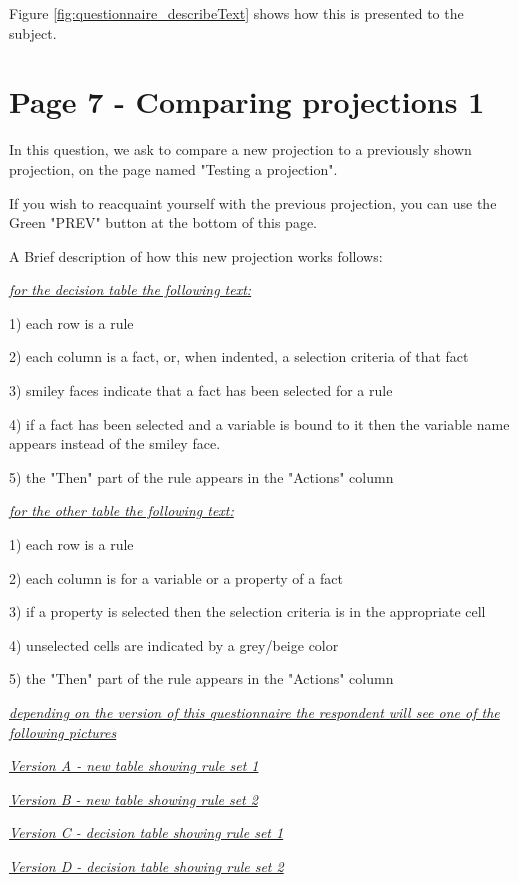 Figure \ref{fig:questionnaire_describeText} shows how this is presented to the subject.

\section{Page 7 - Comparing projections 1}

In this question, we ask to compare a new projection to a previously shown projection, on the page named "Testing a projection".

If you wish to reacquaint yourself with the previous projection, you can use the Green "PREV"  button at the bottom of this page.

A Brief description of how this new projection works follows:

\emph{\underline{for the decision table the following text:}}

1) each row is a rule

2) each column is a fact, or, when indented, a selection criteria of that fact

3) smiley faces indicate that a fact has been selected for a rule

4) if a fact has been selected and a variable is bound to it then the variable name appears instead of the smiley face.

5) the "Then" part of the rule appears in the "Actions" column


\emph{\underline{for the other table the following text:}}

1) each row is a rule

2) each column is for a variable or a property of a fact

3) if a property is selected then the selection criteria is in the appropriate cell

4) unselected cells are indicated by a grey/beige color

5) the "Then" part of the rule appears in the "Actions" column

\emph{\underline{depending on the version of this questionnaire the respondent will see one of the following pictures}}

\emph{\underline{Version A - new table showing rule set 1}}

\emph{\underline{Version B - new table showing rule set 2}}

\emph{\underline{Version C - decision table showing rule set 1}}

\emph{\underline{Version D - decision table showing rule set 2}}

